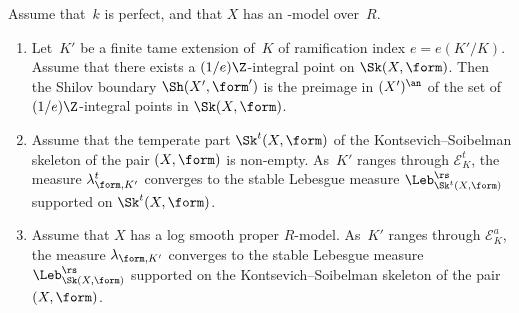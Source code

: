 \begin{theorem}\label{thm:main}
Assume that~$k$ is perfect, and that $X$ has an \snc-model over~$R$.
\begin{enumerate}
\item \label{it:maina} Let~$K'$ be a finite tame extension of~$K$ of ramification index $e=e(K'/K)$.
Assume that there exists a $(1/e)\Z$-integral point on $\Sk(X,\form)$.
Then the Shilov boundary $\Sh(X',\form')$ is the preimage in $(X')^{\an}$ of the set of $(1/e)\Z$-integral points in $\Sk(X,\form)$.

\item \label{it:tame}
Assume that the temperate part $\Sk^t(X,\form)$ of the Kontsevich--Soibelman skeleton of the pair $(X,\form)$ is non-empty.
As~$K'$ ranges through $\mathcal{E}^t_K$, the measure $\lambda^t_{\form,K'}$ converges to the stable Lebesgue measure $\Leb^{\rs}_{\Sk^t(X,\form)}$
supported on $\Sk^t(X,\form)$.

\item \label{it:wild} Assume that $X$ has a log smooth proper $R$\nobreakdash-model.
As~$K'$ ranges through $\mathcal{E}^a_K$, the measure $\lambda_{\form,K'}$ converges to the stable Lebesgue measure $\Leb^{\rs}_{\Sk(X,\form)}$
supported on the Kontsevich--Soibelman skeleton of the pair $(X,\form)$.
\end{enumerate}
\end{theorem}

